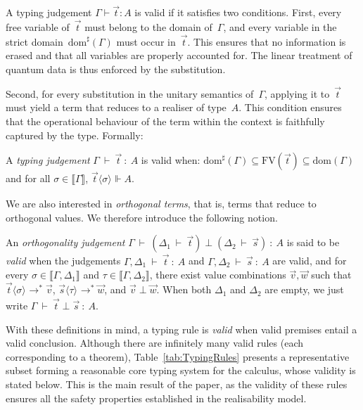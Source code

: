 \documentclass[a4paper,UKenglish,numberwithinsect,pdfa,anonymous]{lipics-v2021}
\theoremstyle{restatestyle}
\newcommand\lra{\longrightarrow}
\newcommand\ansubst[2]{\ensuremath{\langle #1 \rangle_{#2}}}
\newcommand\dom[1]{\mathrm{dom}(#1)}
\newcommand\sdom[1]{\mathrm{dom}^{\sharp}(#1)}
\newcommand\FV[1]{\mathrm{FV}(#1)}
\def\eval{\lra^*}
\def\sem#1{\llbracket#1\rrbracket}
\def\TYP#1#2#3{#1~{\vdash}~#2~{:}~#3}
\def\SORTH#1#2#3#4{#1~{\vdash}~#2\perp#3~{:}~#4}
\def\ORTH#1#2#3#4#5#6{#1~{\vdash}~(#2~{\vdash}~#3)\perp(#4~{\vdash}~#5)~{:}~#6}
\def\real{\Vdash}
\begin{document}
A typing judgement $\Gamma\vdash \vec{t}:A$ is valid if it satisfies two
conditions.  First, every free variable of~$\vec{t}$ must belong to the domain
of~$\Gamma$, and every variable in the strict domain~$\sdom{\Gamma}$ must occur
in~$\vec{t}$.  This ensures that no information is erased and that all variables
are properly accounted for.  The linear treatment of quantum data is thus
enforced by the substitution.

Second, for every substitution in the unitary semantics of~$\Gamma$, applying
it to~$\vec{t}$ must yield a term that reduces to a realiser of type~$A$.  This
condition ensures that the operational behaviour of the term within the context
is faithfully captured by the type. Formally:

\begin{definition}
  A \emph{typing judgement} $\TYP{\Gamma}{\vec{t}}{A}$ is valid when:
    $\sdom{\Gamma}\subseteq\FV{\vec{t}}\subseteq\dom{\Gamma}$
    and
    for all $\sigma\in\sem{\Gamma}$, 
          $\vec{t}\ansubst{\sigma}{}\real A$.
\end{definition}

We are also interested in \emph{orthogonal terms}, that is, terms that reduce
to orthogonal values. We therefore introduce the following notion.

\begin{definition}
  An \emph{orthogonality judgement}
  $\ORTH{\Gamma}{\Delta_1}{\vec{t}}{\Delta_2}{\vec{s}}{A}$
  is said to be \emph{valid} when the judgements
      $\TYP{\Gamma,\Delta_1}{\vec{t}}{A}$ and
      $\TYP{\Gamma,\Delta_2}{\vec{s}}{A}$ are valid, and
      for every
      $\sigma\in\sem{\Gamma,\Delta_1}$ and
      $\tau\in\sem{\Gamma,\Delta_2}$,
      there exist value combinations $\vec{v},\vec{w}$ such that
      $\vec{t}\ansubst{\sigma}{}\eval\vec{v}$,
      $\vec{s}\ansubst{\tau}{}\eval\vec{w}$,
      and $\vec{v}\perp\vec{w}$.
When both $\Delta_1$ and $\Delta_2$ are empty,
we just write $\SORTH{\Gamma}{\vec{t}}{\vec{s}}{A}$.
\end{definition}

With these definitions in mind, a typing rule is \emph{valid} when valid
premises entail a valid conclusion.  
Although there are infinitely many valid rules (each corresponding to a theorem),
Table~\ref{tab:TypingRules} presents a representative subset forming a reasonable
core typing system for the calculus, whose validity is stated below.
This is the main result of the paper, as the validity of these rules ensures all the safety properties established in the realisability model.
\end{document}
